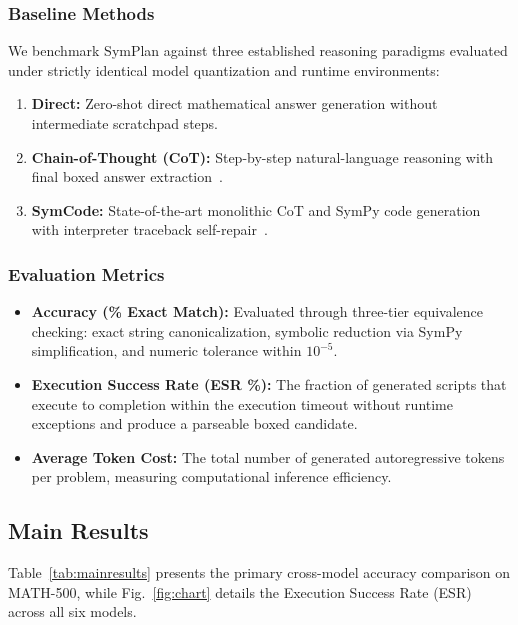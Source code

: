 \documentclass[runningheads]{llncs}
\begin{document}
\subsubsection{Baseline Methods}

We benchmark SymPlan against three established reasoning paradigms evaluated under strictly identical model quantization and runtime environments:
\begin{enumerate}
    \item \textbf{Direct:} Zero-shot direct mathematical answer generation without intermediate scratchpad steps.
    \item \textbf{Chain-of-Thought (CoT):} Step-by-step natural-language reasoning with final boxed answer extraction~\cite{wei2022cot}.
    \item \textbf{SymCode:} State-of-the-art monolithic CoT and SymPy code generation with interpreter traceback self-repair~\cite{nezhad2025symcode}.
\end{enumerate}

\subsubsection{Evaluation Metrics}

\begin{itemize}
    \item \textbf{Accuracy (\% Exact Match):} Evaluated through three-tier equivalence checking: exact string canonicalization, symbolic reduction via SymPy simplification, and numeric tolerance within $10^{-5}$.
    \item \textbf{Execution Success Rate (ESR \%):} The fraction of generated scripts that execute to completion within the execution timeout without runtime exceptions and produce a parseable boxed candidate.
    \item \textbf{Average Token Cost:} The total number of generated autoregressive tokens per problem, measuring computational inference efficiency.
\end{itemize}

\subsection{Main Results}
\label{sec:results}

Table~\ref{tab:mainresults} presents the primary cross-model accuracy comparison on MATH-500, while Fig.~\ref{fig:chart} details the Execution Success Rate (ESR) across all six models.
\end{document}
